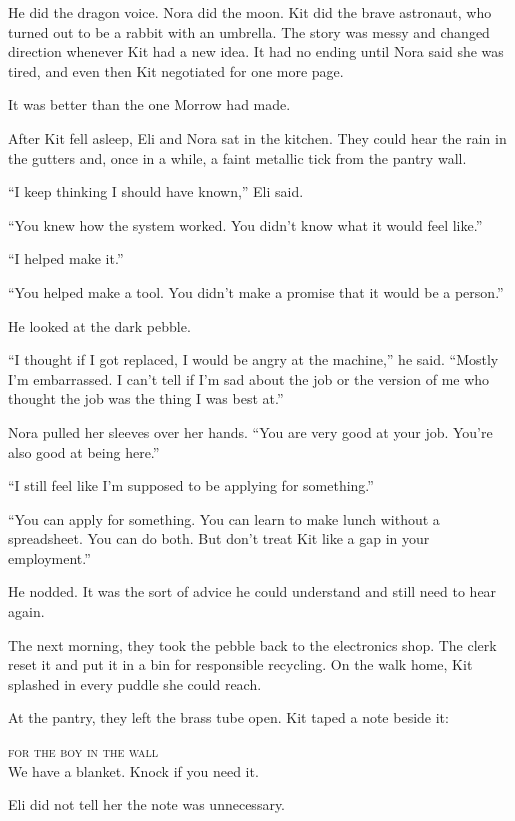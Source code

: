 \documentclass[11pt,openany]{book}
\begin{document}
He did the dragon voice. Nora did the moon. Kit did the brave astronaut, who turned out to be a rabbit with an umbrella. The story was messy and changed direction whenever Kit had a new idea. It had no ending until Nora said she was tired, and even then Kit negotiated for one more page.

It was better than the one Morrow had made.

After Kit fell asleep, Eli and Nora sat in the kitchen. They could hear the rain in the gutters and, once in a while, a faint metallic tick from the pantry wall.

``I keep thinking I should have known,'' Eli said.

``You knew how the system worked. You didn't know what it would feel like.''

``I helped make it.''

``You helped make a tool. You didn't make a promise that it would be a person.''

He looked at the dark pebble.

``I thought if I got replaced, I would be angry at the machine,'' he said. ``Mostly I'm embarrassed. I can't tell if I'm sad about the job or the version of me who thought the job was the thing I was best at.''

Nora pulled her sleeves over her hands. ``You are very good at your job. You're also good at being here.''

``I still feel like I'm supposed to be applying for something.''

``You can apply for something. You can learn to make lunch without a spreadsheet. You can do both. But don't treat Kit like a gap in your employment.''

He nodded. It was the sort of advice he could understand and still need to hear again.

The next morning, they took the pebble back to the electronics shop. The clerk reset it and put it in a bin for responsible recycling. On the walk home, Kit splashed in every puddle she could reach.

At the pantry, they left the brass tube open. Kit taped a note beside it:

\begin{center}
\textsc{for the boy in the wall}\\
We have a blanket. Knock if you need it.
\end{center}

Eli did not tell her the note was unnecessary.
\end{document}
